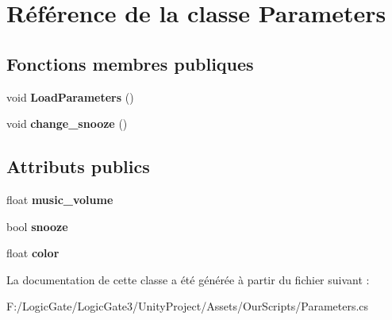 \hypertarget{class_parameters}{}\section{Référence de la classe Parameters}
\label{class_parameters}
\subsection*{Fonctions membres publiques}
\begin{DoxyCompactItemize}
\item 
\mbox{\label{class_parameters_adeed4b45e120cbbba31153e7c8e2dc9a}} 
void {\bfseries Load\+Parameters} ()
\item 
\mbox{\label{class_parameters_a9651655951b8db0a4f7b6e3bee48e9ac}} 
void {\bfseries change\+\_\+snooze} ()
\end{DoxyCompactItemize}
\subsection*{Attributs publics}
\begin{DoxyCompactItemize}
\item 
\mbox{\label{class_parameters_a59453e68e6a3d176b82264ec4098ce2d}} 
float {\bfseries music\+\_\+volume}
\item 
\mbox{\label{class_parameters_aa9c08ea71b0805eee7571d21a857afa4}} 
bool {\bfseries snooze}
\item 
\mbox{\label{class_parameters_a606a40250d5734587390ff228f97fefd}} 
float {\bfseries color}
\end{DoxyCompactItemize}


La documentation de cette classe a été générée à partir du fichier suivant \+:\begin{DoxyCompactItemize}
\item 
F\+:/\+Logic\+Gate/\+Logic\+Gate3/\+Unity\+Project/\+Assets/\+Our\+Scripts/Parameters.\+cs\end{DoxyCompactItemize}
